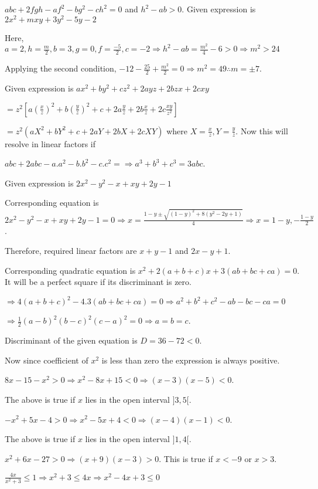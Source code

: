   $abc + 2fgh - af^2 - bg^2 - ch^2 = 0$ and $h^2 - ab > 0$. Given expression is $2x^2 + mxy + 3y^2 - 5y - 2$

  Here, $a = 2, h = \frac{m}{2}, b = 3, g = 0, f = \frac{-5}{2}, c = -2\Rightarrow h^2 - ab = \frac{m^2}{4}
  - 6 > 0\Rightarrow m^2 > 24$

  Applying the second condition, $-12 - \frac{25}{2} + \frac{m^2}{2} = 0\Rightarrow m^2 = 49 \therefore m =
  \pm 7$.
\item Given expression is $ax^2 + by^2 + cz^2 + 2ayz + 2bzx + 2cxy$

  $= z^2\left[a\left(\frac{x}{z}\right)^2 + b\left(\frac{y}{z}\right)^2 + c + 2a\frac{y}{z} + 2b\frac{x}{z}
  + 2c\frac{xy}{z^2}\right]$

  $= z^2(aX^2 + bY^2 + c + 2aY + 2bX + 2cXY)$ where $X = \frac{x}{z}, Y = \frac{y}{z}$. Now this will
  resolve in linear factors if

  $abc + 2abc - a.a^2 - b.b^2 -c.c^2 = \Rightarrow a^3 + b^3 + c^3 = 3abc$.
\item Given expression is $2x^2 - y^2 - x + xy + 2y -1$

  Corresponding equation is $2x^2 - y^2 - x + xy + 2y -1 = 0\Rightarrow x = \frac{1 - y \pm \sqrt{(1 - y)^2
      + 8(y^2 - 2y + 1)}}{4}\Rightarrow x = 1 - y, -\frac{1 - y}{2}$.

  Therefore, required linear factors are $x + y - 1$ and $2x - y + 1$.
\item Corresponding quadratic equation is $x^2 + 2(a + b + c)x + 3(ab + bc + ca) = 0$. It will be a perfect
  square if its discriminant is zero.

  $\Rightarrow 4(a + b + c)^2 - 4.3(ab + bc + ca) = 0\Rightarrow a^2 + b^2 + c^2 - ab - bc - ca =
  0$

  $\Rightarrow \frac{1}{2}(a - b)^2(b - c)^2(c - a)^2 = 0\Rightarrow a = b = c$.
\item Discriminant of the given equation is $D = 36 - 72 < 0$.

  Now since coefficient of $x^2$ is less than zero the expression is always positive.
\item $8x - 15 - x^2 > 0\Rightarrow x^2 - 8x + 15 < 0 \Rightarrow (x - 3)(x - 5) < 0$.

  The above is true if $x$ lies in the open interval $]3, 5[$.
\item $-x^2 + 5x - 4 > 0\Rightarrow x^2 - 5x + 4 < 0\Rightarrow (x - 4)(x - 1) < 0$.

  The above is true if $x$ lies in the open interval $]1, 4[$.
\item $x^2 + 6x - 27 > 0\Rightarrow (x + 9)(x - 3) > 0$. This is true if $x < -9$ or $x > 3$.
\item $\frac{4x}{x^2 + 3} \le 1 \Rightarrow x^2 + 3 \le 4x\Rightarrow x^2 - 4x + 3 \le 0$

